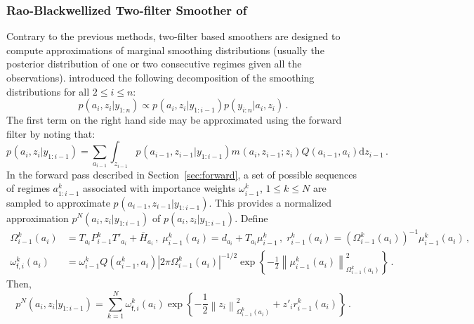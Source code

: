 \documentclass[nolayout]{article}
\theoremstyle{plain}
\theoremstyle{definition}
\newcommand{\1}{\mathbbm{1}}
\def\rmd{\mathrm{d}}
\def\barH{\overline{H}}
\def\eqsp{\,}
\newcommand{\normMat}[2]{\left\|#2\right\|_{#1}}
\begin{document}
\subsubsection{Rao-Blackwellized Two-filter Smoother of \cite{briers:doucet:maskell:2010}}
\label{eq:rbtf}
Contrary to the previous methods, two-filter based smoothers are designed to compute approximations of marginal smoothing distributions (usually the posterior distribution of one or two consecutive  regimes given all the observations). \cite{briers:doucet:maskell:2010} introduced the following decomposition of the smoothing distributions for all $2\le i \le n$:
\begin{equation}
\label{eq:dens:bwd_fwd_doucet}
p(a_{i},z_{i}|y_{1:n})  \propto  p_{}(a_{i},z_{i}|y_{1:i-1})p(y_{i:n}|a_i,z_i)\eqsp.
\end{equation}
The first term on the right hand side may be approximated using the forward filter by noting that:
\[
 p_{}(a_{i},z_{i}|y_{1:i-1}) =\sum_{a_{i-1}}\int_{z_{i-1}}p_{}(a_{i-1},z_{i-1}|y_{1:i-1})m_{}(a_{i},z_{i-1};z_{i})Q(a_{i-1},a_{i}) \rmd z_{i-1}\eqsp.
\]
In the forward pass described in Section~\ref{sec:forward}, a set of possible sequences of regimes $a_{1:i-1}^k$ associated with importance weights $\omega_{i-1}^k$, $1\le k\le N$ are sampled to approximate $p_{}(a_{i-1},z_{i-1}|y_{1:i-1})$. This provides a normalized approximation $p^N(a_{i},z_{i}|y_{1:i-1})$ of $p(a_{i},z_{i}|y_{1:i-1})$. Define
\begin{align*}
\Omega^k_{i-1}(a_{i}) &= T_{a_{i}}P^k_{i-1}T'_{a_{i}} + \barH_{a_{i}}\eqsp,\;\mu^k_{i-1}(a_{i}) = d_{a_{i}} + T_{a_{i}}\mu^k_{i-1}\eqsp,\;r_{i-1}^k(a_{i}) = (\Omega^k_{i-1}(a_{i}))^{-1}\mu^k_{i-1}(a_{i})\eqsp,\\
\omega_{\mathsf{f},i}^k(a_{i}) &= \omega^k_{i-1}Q(a^k_{i-1},a_{i}) \left|2\pi \Omega^k_{i-1}(a_{i})\right|^{-1/2}\exp\left\{-\frac{1}{2}\normMat{\Omega^k_{i-1}(a_{i})}{\mu^k_{i-1}(a_{i})}^2\right\}\eqsp.
\end{align*}
Then,
\begin{equation}
\label{eq:rN}
p^N(a_{i},z_{i}|y_{1:i-1}) = \sum_{k=1}^N \omega_{\mathsf{f},i}^k(a_{i})\exp\left\{-\frac{1}{2}\normMat{\Omega^k_{i-1}(a_{i})}{z_{i}}^2+z'_{i}r_{i-1}^k(a_{i})\right\}\eqsp.
\end{equation}
\end{document}
